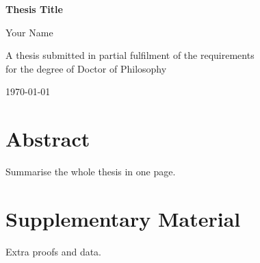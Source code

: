 \documentclass[12pt,a4paper,oneside]{report}
\begin{document}
\begin{titlepage}
  \centering
  \vspace*{3cm}
  {\Huge\bfseries Thesis Title\par}
  \vspace{1.5cm}
  {\Large Your Name\par}
  \vfill
  A thesis submitted in partial fulfilment of the requirements\\
  for the degree of Doctor of Philosophy\par
  \vspace{1cm}
  {\large \today\par}
\end{titlepage}

\chapter*{Abstract}
Summarise the whole thesis in one page.

\tableofcontents
\listoffigures
\listoftables

\cleardoublepage
{}




\appendix
\chapter{Supplementary Material}
Extra proofs and data.



\end{document}
